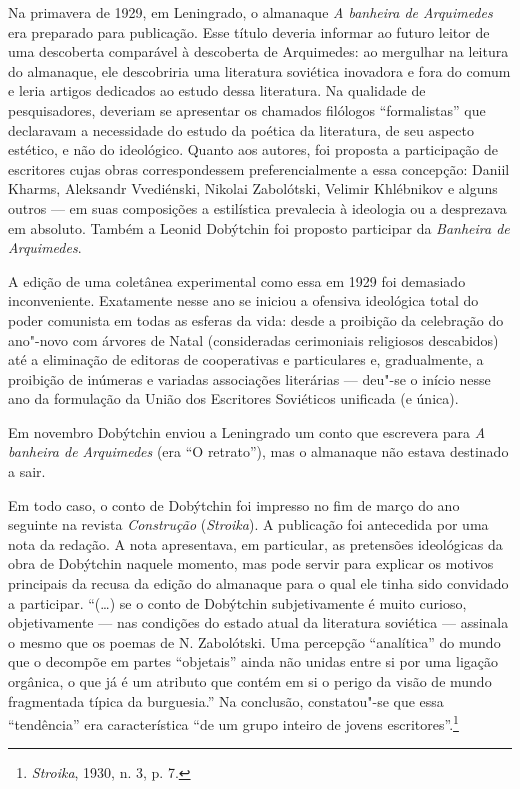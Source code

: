 \movetooddpage
\pagebreak
\begin{center}
{}
\end{center}
\label{prefacio}


Na primavera de 1929, em Leningrado, o almanaque \emph{A banheira de
Arquimedes} era preparado para publicação. Esse título deveria informar
ao futuro leitor de uma descoberta comparável à descoberta de
Arquimedes: ao mergulhar na leitura do almanaque, ele descobriria uma
literatura soviética inovadora e fora do comum e leria artigos dedicados
ao estudo dessa literatura. Na qualidade de pesquisadores, deveriam se
apresentar os chamados filólogos ``formalistas'' que declaravam a
necessidade do estudo da poética da literatura, de seu aspecto estético,
e não do ideológico. Quanto aos autores, foi proposta a participação de
escritores cujas obras correspondessem preferencialmente a essa
concepção: Daniil Kharms, Aleksandr Vvediénski, Nikolai Zabolótski,
Velimir Khlébnikov e alguns outros --- em suas composições a estilística
prevalecia à ideologia ou a desprezava em absoluto. Também a Leonid
Dobýtchin foi proposto participar da \emph{Banheira de Arquimedes}.

A edição de uma coletânea experimental como essa em 1929 foi demasiado
inconveniente. Exatamente nesse ano se iniciou a ofensiva ideológica
total do poder comunista em todas as esferas da vida: desde a proibição
da celebração do ano"-novo com árvores de Natal (consideradas cerimoniais
religiosos descabidos) até a eliminação de editoras de cooperativas e
particulares e, gradualmente, a proibição de inúmeras e variadas
associações literárias --- deu"-se o início nesse ano da formulação da
União dos Escritores Soviéticos unificada (e única).

Em novembro Dobýtchin enviou a Leningrado um conto que escrevera para
\emph{A banheira de Arquimedes} (era ``O retrato''), mas o almanaque não
estava destinado a sair.

Em todo caso, o conto de Dobýtchin foi impresso no fim de março do ano
seguinte na revista \emph{Construção} (\emph{Stroika}). A publicação foi
antecedida por uma nota da redação. A nota apresentava, em particular,
as pretensões ideológicas da obra de Dobýtchin naquele momento, mas pode
servir para explicar os motivos principais da recusa da edição do
almanaque para o qual ele tinha sido convidado a participar. ``(\ldots{}) se
o conto de Dobýtchin subjetivamente é muito curioso, objetivamente ---
nas condições do estado atual da literatura soviética --- assinala o
mesmo que os poemas de N. Zabolótski. Uma percepção ``analítica'' do
mundo que o decompõe em partes ``objetais'' ainda não unidas entre si
por uma ligação orgânica, o que já é um atributo que contém em si o
perigo da visão de mundo fragmentada típica da burguesia.'' Na
conclusão, constatou"-se que essa ``tendência'' era característica ``de
um grupo inteiro de jovens escritores''.\footnote{\emph{Stroika}, 1930,
  n. 3, p. 7.}

